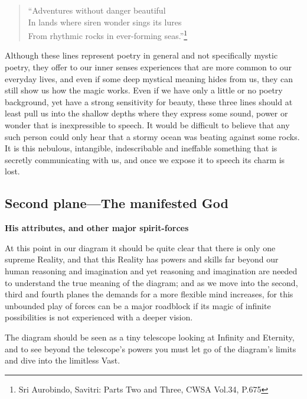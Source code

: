\documentclass[12pt,a4paper]{book}
\begin{document}
\newpage
\begin{verse}
``Adventures without danger beautiful\\
In lands where siren wonder sings its lures\\
From rhythmic rocks in ever-forming seas.''\footnote{Sri Aurobindo, Savitri: Parts Two and Three, CWSA Vol.34, P.675}
\end{verse}

Although these lines represent poetry in general and not specifically
mystic poetry, they offer to our inner senses experiences that are
more common to our everyday lives, and even if some deep mystical
meaning hides from us, they can still show us how the magic
works. Even if we have only a little or no poetry background, yet have
a strong sensitivity for beauty, these three lines should at least
pull us into the shallow depths where they express some sound, power
or wonder that is inexpressible to speech. It would be difficult to
believe that any such person could only hear that a stormy ocean was
beating against some rocks. It is this nebulous, intangible,
indescribable and ineffable something that is secretly communicating
with us, and once we expose it to speech its charm is lost.


\newpage
\begin{center}\section*{Second plane---The manifested God}\end{center}

\begin{center}{\bf His attributes, and other major spirit-forces}\end{center}



At this point in our diagram it should be quite clear that there is
only one supreme Reality, and that this Reality has powers and skills
far beyond our human reasoning and imagination and yet reasoning and
imagination are needed to understand the true meaning of the diagram;
and as we move into the second, third and fourth planes the demands
for a more flexible mind increases, for this unbounded play of forces
can be a major roadblock if its magic of infinite possibilities is not
experienced with a deeper vision.

The diagram should be seen as a tiny telescope looking at Infinity and
Eternity, and to see beyond the telescope's powers you must let go of
the diagram's limits and dive into the limitless Vast.
\end{document}
